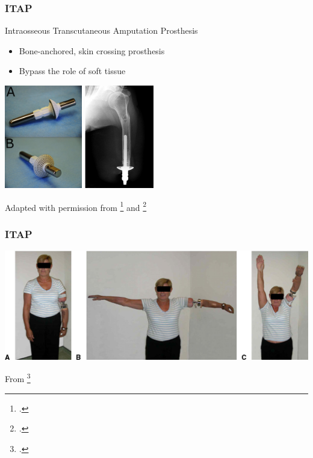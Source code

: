 \begin{frame}
    \frametitle{ITAP}
    Intraosseous Transcutaneous Amputation Prosthesis
\begin{itemize}
    \item Bone-anchored, skin crossing prosthesis
    \item Bypass the role of soft tissue
\end{itemize}
        \includegraphics[height=4.5cm]{figures/ITAP-old.jpg}
        \includegraphics[height=4.5cm]{figures/ITAP-xray.jpg}
        {\tiny {}}

        {\tiny Adapted with permission from \footcite{Fitzpatrick2011ITAP} and \footcite{KANG20101130} }

\end{frame}

\begin{frame}
    \frametitle{ITAP}

    \includegraphics[width=1\textwidth]{figures/itap-prosthesis.jpg}

    From \footcite{KANG20101130}

\end{frame}

